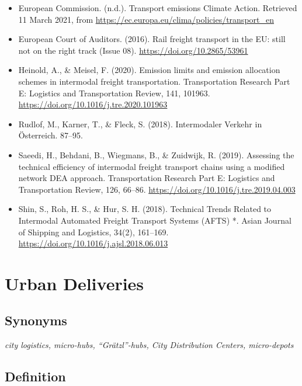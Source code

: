\documentclass[
]{book}
\providecommand{\tightlist}{%
  \setlength{\itemsep}{0pt}\setlength{\parskip}{0pt}}
\begin{document}
\begin{itemize}
\tightlist
\item
  European Commission. (n.d.). Transport emissions \textbar{} Climate Action. Retrieved 11 March 2021, from \url{https://ec.europa.eu/clima/policies/transport_en}
\item
  European Court of Auditors. (2016). Rail freight transport in the EU: still not on the right track (Issue 08). \url{https://doi.org/10.2865/53961}
\item
  Heinold, A., \& Meisel, F. (2020). Emission limits and emission allocation schemes in intermodal freight transportation. Transportation Research Part E: Logistics and Transportation Review, 141, 101963. \url{https://doi.org/10.1016/j.tre.2020.101963}
\item
  Rudlof, M., Karner, T., \& Fleck, S. (2018). Intermodaler Verkehr in Österreich. 87--95.
\item
  Saeedi, H., Behdani, B., Wiegmans, B., \& Zuidwijk, R. (2019). Assessing the technical efficiency of intermodal freight transport chains using a modified network DEA approach. Transportation Research Part E: Logistics and Transportation Review, 126, 66--86. \url{https://doi.org/10.1016/j.tre.2019.04.003}
\item
  Shin, S., Roh, H. S., \& Hur, S. H. (2018). Technical Trends Related to Intermodal Automated Freight Transport Systems (AFTS) *. Asian Journal of Shipping and Logistics, 34(2), 161--169. \url{https://doi.org/10.1016/j.ajsl.2018.06.013}
\end{itemize}

\hypertarget{urban_delivery}{%
\section{Urban Deliveries}\label{urban_delivery}}

\hypertarget{synonyms-27}{%
\subsection*{Synonyms}\label{synonyms-27}}

\emph{city logistics, micro-hubs, ``Grätzl''-hubs, City Distribution Centers, micro-depots}

\hypertarget{definition-30}{%
\subsection*{Definition}\label{definition-30}}
\end{document}
